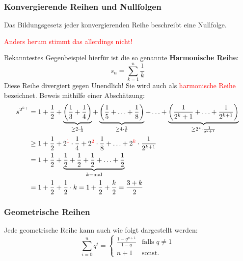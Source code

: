\subsubsection{Konvergierende Reihen und Nullfolgen}
Das Bildungsgesetz jeder konvergierenden Reihe beschreibt eine Nullfolge.
\begin{center}
\textcolor{red}{Anders herum stimmt das allerdings nicht!}
\end{center}
Bekanntestes Gegenbeispiel hierfür ist die so genannte \textbf{Harmonische Reihe}:
\begin{equation*}
s_n = \sum\limits_{k=1}^{n}\frac{1}{k}
\end{equation*}
Diese Reihe divergiert gegen Unendlich! Sie wird auch als \textcolor{red}{harmonische Reihe} bezeichnet. Beweis mithilfe einer Abschätzung:
\begin{align*}
s^{2^{k+}} &= 1 + \frac{1}{2} + \underbrace{\left( \frac{1}{3} + \frac{1}{4} \right)}_{\geq 2 \cdot \frac{1}{4}} + \underbrace{\left( \frac{1}{5} + \ldots + \frac{1}{8} \right)}_{\geq 4 \cdot \frac{1}{8}} + \ldots + \underbrace{\left( \frac{1}{2^k + 1} + \ldots + \frac{1}{2^{k+1}} \right)}_{\geq 2^k \cdot \frac{1}{2^{k + 1}}}\\
&\geq 1 + \frac{1}{2} + 2^{\color{red}1} \cdot \frac{1}{4} + 2^{\color{red}2} \cdot \frac{1}{8} + \ldots + 2^{\color{red}k} \cdot \frac{1}{2^{k+1}} \\
&= 1 + \frac{1}{2} + \underbrace{\frac{1}{2} + \frac{1}{2} + \frac{1}{2} + \ldots + \frac{1}{2}}_{k-\text{mal}}\\
&= 1 + \frac{1}{2} + \frac{1}{2} \cdot k =  1 + \frac{1}{2} + \frac{k}{2} = \frac{3 + k}{2}
\end{align*}

\subsubsection{Geometrische Reihen}
Jede geometrische Reihe kann auch wie folgt dargestellt werden:
\begin{equation*}
\sum\limits_{i=0}^{n} q^i = \begin{cases} \frac{1-q^{n+1}}{1-q} &\mbox{falls } q \neq 1 \\ 
n + 1 & \mbox{sonst.} \end{cases}
\end{equation*}
